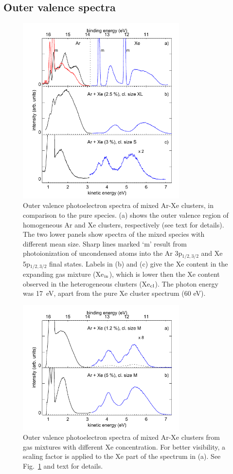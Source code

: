 \subsection{Outer valence spectra}
%
\begin{figure}[ht]
 \centering
 \includegraphics[width=8.5cm]{pics/figure_oval_1.pdf}
 \caption{
Outer valence photoelectron spectra of mixed Ar-Xe clusters, in comparison to the pure species. 
(a) shows the outer valence region of homogeneous Ar and Xe clusters, respectively (see text for details). 
The two lower panels show spectra of the mixed species with different mean size. 
Sharp lines marked `m' result from photoionization of uncondensed atoms into the Ar 3p$_{1/2,3/2}$ and Xe 5p$_{1/2,3/2}$ final states. 
Labels in (b) and (c) give the Xe content in the expanding gas mixture (Xe$_{\rm in}$), which is lower then the Xe content observed in the heterogeneous clusters (Xe$_{\rm cl}$). 
The photon energy was 17~eV, apart from the pure Xe cluster spectrum (60 eV).
}
 \label{figure:oval1}
\end{figure}


\begin{figure}[ht]
 \centering
 \includegraphics[width=8.5cm]{pics/figure_oval_2.pdf}
 \caption{
Outer valence photoelectron spectra of mixed Ar-Xe clusters from gas mixtures with different Xe concentration. 
For better visibility, a scaling factor is applied to the Xe part of the spectrum in (a).
See Fig.\ \ref{figure:oval1} and text for details.
}
 \label{figure:oval2}
\end{figure}

